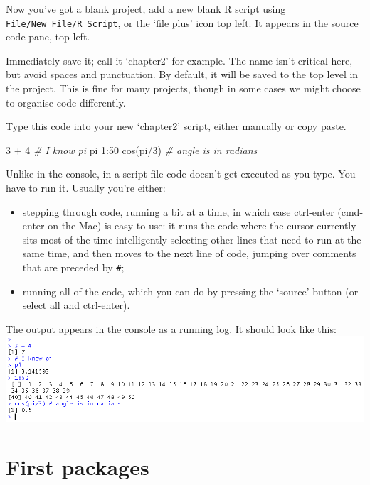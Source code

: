 \documentclass[
]{book}
\newenvironment{Shaded}{\begin{snugshade}}{\end{snugshade}}
\newcommand{\CommentTok}[1]{\textcolor[rgb]{0.56,0.35,0.01}{\textit{#1}}}
\newcommand{\DecValTok}[1]{\textcolor[rgb]{0.00,0.00,0.81}{#1}}
\newcommand{\FunctionTok}[1]{\textcolor[rgb]{0.00,0.00,0.00}{#1}}
\newcommand{\NormalTok}[1]{#1}
\newcommand{\SpecialCharTok}[1]{\textcolor[rgb]{0.00,0.00,0.00}{#1}}
\providecommand{\tightlist}{%
  \setlength{\itemsep}{0pt}\setlength{\parskip}{0pt}}
\begin{document}
Now you've got a blank project, add a new blank R script using \texttt{File/New\ File/R\ Script}, or the `file plus' icon top left. It appears in the source code pane, top left.

Immediately save it; call it `chapter2' for example. The name isn't critical here, but avoid spaces and punctuation. By default, it will be saved to the top level in the project. This is fine for many projects, though in some cases we might choose to organise code differently.

Type this code into your new `chapter2' script, either manually or copy paste.

\begin{Shaded}
\begin{Highlighting}[]
\DecValTok{3} \SpecialCharTok{+} \DecValTok{4}
\CommentTok{\# I know pi}
\NormalTok{pi}
\DecValTok{1}\SpecialCharTok{:}\DecValTok{50}
\FunctionTok{cos}\NormalTok{(pi}\SpecialCharTok{/}\DecValTok{3}\NormalTok{) }\CommentTok{\# angle is in radians}
\end{Highlighting}
\end{Shaded}

Unlike in the console, in a script file code doesn't get executed as you type. You have to run it. Usually you're either:

\begin{itemize}
\tightlist
\item
  stepping through code, running a bit at a time, in which case ctrl-enter (cmd-enter on the Mac) is easy to use: it runs the code where the cursor currently sits most of the time intelligently selecting other lines that need to run at the same time, and then moves to the next line of code, jumping over comments that are preceded by \texttt{\#};
\item
  running all of the code, which you can do by pressing the `source' button (or select all and ctrl-enter).
\end{itemize}

The output appears in the console as a running log. It should look like this:
\includegraphics{images/result of 3 plus 4.png}

\hypertarget{packages}{%
\section{First packages}\label{packages}}
\end{document}
